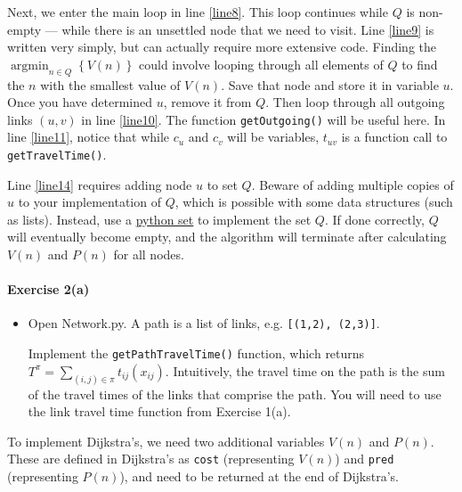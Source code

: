 \documentclass[11pt]{article}
\DeclareMathOperator*{\argmin}{\arg\min}
\begin{document}
Next, we enter the main loop in line \ref{line8}. This loop continues while $Q$ is non-empty --- while there is an unsettled node that we need to visit. Line \ref{line9} is written very simply, but can actually require more extensive code. Finding the $\argmin_{n\in Q} \left\{V(n)\right\}$ could involve looping through all elements of $Q$ to find the $n$ with the smallest value of $V(n)$. Save that node and store it in variable $u$. Once you have determined $u$, remove it from $Q$. Then loop through all outgoing links $(u,v)$ in line \ref{line10}. The function \texttt{getOutgoing()}  will be useful here. In line \ref{line11}, notice that while $c_u$ and $c_v$ will be variables, $t_{uv}$ is a function call to \texttt{getTravelTime()}.


 Line \ref{line14} requires adding node $u$ to set $Q$. Beware of adding multiple copies of $u$ to your implementation of $Q$, which is possible with some data structures (such as lists). Instead, use a \href{https://www.w3schools.com/python/python_sets.asp}{python set} to implement the set $Q$. If done correctly, $Q$ will eventually become empty, and the algorithm will terminate after calculating $V(n)$ and $P(n)$ for all nodes. 







\paragraph*{Exercise 2(a)} 
\begin{itemize}
	\item Open Network.py. A path is a list of links, e.g. \texttt{[(1,2), (2,3)]}.
	
	
	 Implement the \texttt{getPathTravelTime()} function, which returns $T^\pi = \sum_{(i,j)\in\pi} t_{ij}(x_{ij})$. Intuitively, the travel time on the path is the sum of the travel times of the links that comprise the path. You will need to use the link travel time function from Exercise 1(a).
\end{itemize}



\vspace{\baselineskip}

\noindent
To implement Dijkstra's, we need two additional variables $V(n)$ and $P(n)$.
These are defined in Dijkstra's as \texttt{cost} (representing $V(n)$) and \texttt{pred} (representing $P(n)$), and need to be returned at the end of Dijkstra's.
\end{document}
